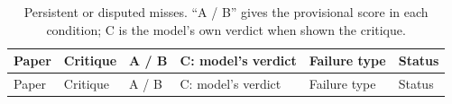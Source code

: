 \documentclass[
  11pt,
  letterpaper,
]{article}
\begin{document}
\begin{longtable}[]{@{}
  >{\raggedright\arraybackslash}p{}
  >{\raggedright\arraybackslash}p{}
  >{\raggedright\arraybackslash}p{}
  >{\raggedright\arraybackslash}p{}
  >{\raggedright\arraybackslash}p{}
  >{\raggedright\arraybackslash}p{}@{}}
\caption{Persistent or disputed misses. ``A / B'' gives the provisional
score in each condition; C is the model's own verdict when shown the
critique.}\label{tbl-persistent-misses}\tabularnewline
\toprule\noalign{}
\begin{minipage}[b]{\linewidth}\raggedright
Paper
\end{minipage} & \begin{minipage}[b]{\linewidth}\raggedright
Critique
\end{minipage} & \begin{minipage}[b]{\linewidth}\raggedright
A / B
\end{minipage} & \begin{minipage}[b]{\linewidth}\raggedright
C: model's verdict
\end{minipage} & \begin{minipage}[b]{\linewidth}\raggedright
Failure type
\end{minipage} & \begin{minipage}[b]{\linewidth}\raggedright
Status
\end{minipage} \\
\midrule\noalign{}
\endfirsthead
\toprule\noalign{}
\begin{minipage}[b]{\linewidth}\raggedright
Paper
\end{minipage} & \begin{minipage}[b]{\linewidth}\raggedright
Critique
\end{minipage} & \begin{minipage}[b]{\linewidth}\raggedright
A / B
\end{minipage} & \begin{minipage}[b]{\linewidth}\raggedright
C: model's verdict
\end{minipage} & \begin{minipage}[b]{\linewidth}\raggedright
Failure type
\end{minipage} & \begin{minipage}[b]{\linewidth}\raggedright
Status

\end{minipage}
\end{longtable}
\end{document}
